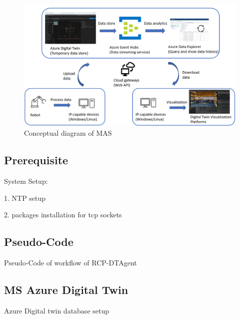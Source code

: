 \begin{figure}[htb]
\includegraphics[width=16cm]{figures/DT_Conceptual_Diagram.png}
\centering
\caption{Conceptual diagram of MAS\label{fig: DTConceptual}}
\end{figure}



\subsection{Prerequisite}
System Setup: 


1. NTP setup


2. packages installation for tcp sockets


\subsection{Pseudo-Code}
Pseudo-Code of workflow of RCP-DTAgent

\subsection{MS Azure Digital Twin}
Azure Digital twin database setup